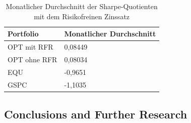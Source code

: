\documentclass[12pt]{article}
\begin{document}
        \begin{table}[htp]
            \begin{center}
                
                \begin{tabular}{ | l | l | }

                    \hline
                    \textbf{Portfolio}   & \textbf{Monatlicher Durchschnitt} \\
                    \hline
                    OPT mit RFR          & 0,08449 \\      
                    OPT ohne RFR         & 0,08034 \\
                    EQU                  & -0,9651 \\            
                    GSPC                 & -1,1035 \\     
                            
                    \hline

                \end{tabular}
                \caption{Monatlicher Durchschnitt der Sharpe-Quotienten mit dem Risikofreinen Zinssatz}
                \label{md-sq-mit-rfz}

            \end{center}
        \end{table}

        
        \newpage \subsection{Conclusions and Further Research}
\end{document}

